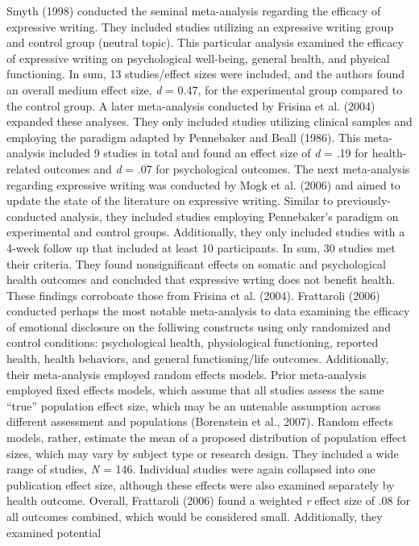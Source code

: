 \documentclass[english,man, mask]{apa6}
\newcounter{author}
\theoremstyle{definition}
\theoremstyle{definition}
\theoremstyle{definition}
\theoremstyle{remark}
\begin{document}
Smyth (1998) conducted the seminal meta-analysis regarding the efficacy
of expressive writing. They included studies utilizing an expressive
writing group and control group (neutral topic). This particular
analysis examined the efficacy of expressive writing on psychological
well-being, general health, and physical functioning. In sum, 13
studies/effect sizes were included, and the authors found an overall
medium effect size, \emph{d} = 0.47, for the experimental group compared
to the control group. A later meta-analysis conducted by Frisina et al.
(2004) expanded these analyses. They only included studies utilizing
clinical samples and employing the paradigm adapted by Pennebaker and
Beall (1986). This meta-analysis included 9 studies in total and found
an effect size of \emph{d} = .19 for health-related outcomes and
\emph{d} = .07 for psychological outcomes. The next meta-analysis
regarding expressive writing was conducted by Mogk et al. (2006) and
aimed to update the state of the literature on expressive writing.
Similar to previously-conducted analysis, they included studies
employing Pennebaker's paradigm on experimental and control groups.
Additionally, they only included studies with a 4-week follow up that
included at least 10 participants. In sum, 30 studies met their
criteria. They found nonsignificant effects on somatic and psychological
health outcomes and concluded that expressive wrting does not benefit
health. These findings corroboate those from Frisina et al. (2004).
Frattaroli (2006) conducted perhaps the most notable meta-analysis to
data examining the efficacy of emotional disclosure on the folliwing
constructs using only randomized and control conditions: psychological
health, physiological functioning, reported health, health behaviors,
and general functioning/life outcomes. Additionally, their meta-analysis
employed random effects models. Prior meta-analysis employed fixed
effects models, which assume that all studies assess the same
\enquote{true} population effect size, which may be an untenable
assumption across different assessment and populations (Borenstein et
al., 2007). Random effects models, rather, estimate the mean of a
proposed distribution of population effect sizes, which may vary by
subject type or research design. They included a wide range of studies,
\emph{N} = 146. Individual studies were again collapsed into one
publication effect size, although these effects were also examined
separately by health outcome. Overall, Frattaroli (2006) found a
weighted \emph{r} effect size of .08 for all outcomes combined, which
would be considered small. Additionally, they examined potential
\end{document}
